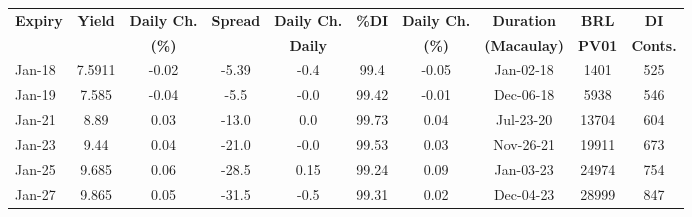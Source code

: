 \documentclass[article,crop=false]{standalone}%
\begin{document}
%
\normalsize%
\setlength{\tabcolsep}{0.15cm}%
\begin{tabular}[h]{l|c c|c c|c c|c c c}%
\hline%
\rowcolor{white}%
\textbf{Expiry}&\textbf{Yield}&\textbf{Daily Ch.}&\textbf{Spread}&\textbf{Daily Ch.}&\textbf{\%DI}&\textbf{Daily Ch.}&\textbf{Duration}&\textbf{BRL}&\textbf{DI}\\%
\rowcolor{white}%
\textbf{}&\textbf{}&\textbf{(\%)}&\textbf{}&\textbf{Daily}&\textbf{}&\textbf{(\%)}&\textbf{(Macaulay)}&\textbf{PV01}&\textbf{Conts.}\\%
\hline%
\rowcolor{lightgray}%
Jan{-}18&7.5911&{-}0.02&{-}5.39&{-}0.4&99.4&{-}0.05&Jan{-}02{-}18&1401&525\\%
\rowcolor{white}%
Jan{-}19&7.585&{-}0.04&{-}5.5&{-}0.0&99.42&{-}0.01&Dec{-}06{-}18&5938&546\\%
\rowcolor{lightgray}%
Jan{-}21&8.89&0.03&{-}13.0&0.0&99.73&0.04&Jul{-}23{-}20&13704&604\\%
\rowcolor{white}%
Jan{-}23&9.44&0.04&{-}21.0&{-}0.0&99.53&0.03&Nov{-}26{-}21&19911&673\\%
\rowcolor{lightgray}%
Jan{-}25&9.685&0.06&{-}28.5&0.15&99.24&0.09&Jan{-}03{-}23&24974&754\\%
\rowcolor{white}%
Jan{-}27&9.865&0.05&{-}31.5&{-}0.5&99.31&0.02&Dec{-}04{-}23&28999&847\\%
\hline%
\end{tabular}%
\end{document}
